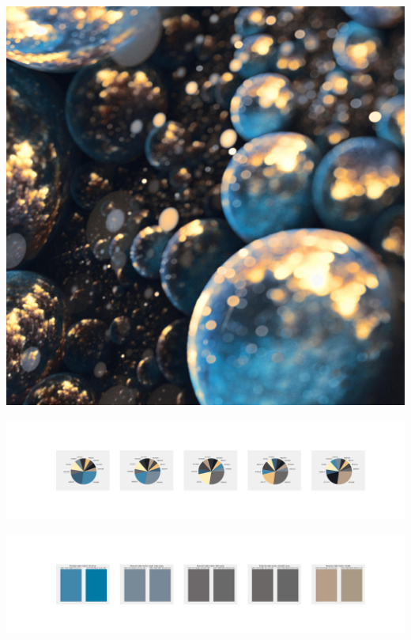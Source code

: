 \documentclass[11pt]{article}
\begin{document}
\begin{landscape}
    \begin{center}
    \includegraphics[width=\textwidth]{./nbimg/file (363).jpg}
    \end{center}

    \begin{center}
    \includegraphics[width=250mm]{./nbimg/pie-293.jpg}
    \end{center}

    \begin{center}
    \includegraphics[width=250mm]{./nbimg/peak-293.jpg}
    \end{center}
    


\end{landscape}
\end{document}
